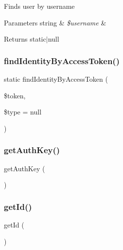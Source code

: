 Finds user by username


\begin{DoxyParams}[1]{Parameters}
string & {\em \$username} & \\
\hline
\end{DoxyParams}
\begin{DoxyReturn}{Returns}
static$\vert$null 
\end{DoxyReturn}
\hypertarget{classapp_1_1models_1_1_user_a38e0c72af43ac43dc7b789b796c27319}{}\label{classapp_1_1models_1_1_user_a38e0c72af43ac43dc7b789b796c27319} 
\subsubsection{\texorpdfstring{find\+Identity\+By\+Access\+Token()}{findIdentityByAccessToken()}}
{\footnotesize\ttfamily static find\+Identity\+By\+Access\+Token (\begin{DoxyParamCaption}\item[{}]{\$token,  }\item[{}]{\$type = {\ttfamily null} }\end{DoxyParamCaption})\hspace{0.3cm}{\ttfamily [static]}}

\hypertarget{classapp_1_1models_1_1_user_a16828b12b5cf4522cb93f64c2b1af43b}{}\label{classapp_1_1models_1_1_user_a16828b12b5cf4522cb93f64c2b1af43b} 
\subsubsection{\texorpdfstring{get\+Auth\+Key()}{getAuthKey()}}
{\footnotesize\ttfamily get\+Auth\+Key (\begin{DoxyParamCaption}{ }\end{DoxyParamCaption})}

\hypertarget{classapp_1_1models_1_1_user_a12251d0c022e9e21c137a105ff683f13}{}\label{classapp_1_1models_1_1_user_a12251d0c022e9e21c137a105ff683f13} 
\subsubsection{\texorpdfstring{get\+Id()}{getId()}}
{\footnotesize\ttfamily get\+Id (\begin{DoxyParamCaption}{ }\end{DoxyParamCaption})}

